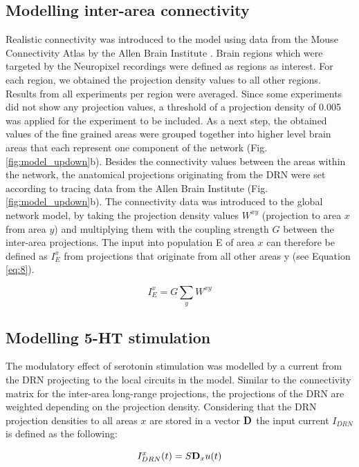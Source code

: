 \documentclass[11pt,a4paper,onecolumn]{article}
\renewcommand{\vec}[1]{\text{\bfseries #1}}
\begin{document}
\subsection*{Modelling inter-area connectivity\label{sec:abc}}
Realistic connectivity was introduced to the model using data from the Mouse Connectivity Atlas by the Allen Brain Institute \citep{oh_mesoscale_2014, knox_high-resolution_2018}. Brain regions which were targeted by the Neuropixel recordings were defined as regions as interest. For each region, we obtained the projection density values to all other regions. Results from all experiments per region were averaged. Since some experiments did not show any projection values, a threshold of a projection density of 0.005 was applied for the experiment to be included. As a next step, the obtained values of the fine grained areas were grouped together into higher level brain areas that each represent one component of the network (Fig. \ref{fig:model_updown}b). Besides the connectivity values between the areas within the network, the anatomical projections originating from the DRN were set according to tracing data from the Allen Brain Institute (Fig. \ref{fig:model_updown}b). The connectivity data was introduced to the global network model, by taking the projection density values $W^{xy}$ (projection to area $x$ from area $y$) and multiplying them with the coupling strength $G$ between the inter-area projections. The input into population E of area $x$ can therefore be defined as $I^x_E$ from projections that originate from all other areas y (see Equation \ref{eq:8}). 

\begin{equation}\label{eq:8}
    I^x_E = G \sum_y W^{xy}
\end{equation}

\subsection*{Modelling 5-HT stimulation}
The modulatory effect of serotonin stimulation was modelled by a current from the DRN projecting to the local circuits in the model. Similar to the connectivity matrix for the inter-area long-range projections, the projections of the DRN are weighted depending on the projection density. Considering that the DRN projection densities to all areas $x$ are stored in a vector $\vec{D}$ the input current $I_{DRN}$ is defined as the following:

\begin{equation}\label{eq:9}
    I^x_{DRN}(t) = S\vec{D}_x u(t)
\end{equation}
\end{document}
